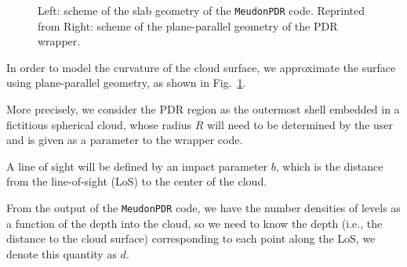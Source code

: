 \documentclass[12pt,a4paper]{article}
\newcommand{\mdpdr}{\texttt{MeudonPDR} code}
\begin{document}
\begin{figure}
    \centering
    \hfill
    \caption{Left: scheme of the slab geometry of the \mdpdr{}. Reprinted from \textcite{LePetit_2006} Right: scheme of the plane-parallel geometry of the PDR wrapper.} \label{fig:geometry}
\end{figure}

In order to model the curvature of the cloud surface, we approximate the surface using plane-parallel geometry, as shown in Fig.~\ref{fig:geometry}.

More precisely, we consider the PDR region as the outermost shell embedded in a fictitious spherical cloud, whose radius $R$ will need to be determined by the user and is given as a parameter to the wrapper code.

A line of sight will be defined by an impact parameter $b$, which is the distance from the line-of-sight (LoS) to the center of the cloud. 

From the output of the \mdpdr{}, we have the number densities of levels as a function of the depth into the cloud, so we need to know the depth (i.e., the distance to the cloud surface) corresponding to each point along the LoS, we denote this quantity as $d$.
\end{document}
